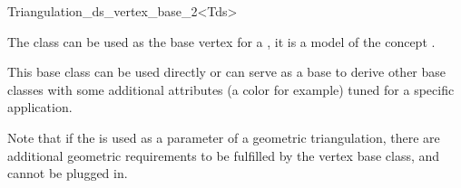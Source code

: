 

\begin{ccRefClass}{Triangulation_ds_vertex_base_2<Tds>}  %


\ccDefinition

The class  can be used as the base vertex
for a , it is a model of the concept
.

This base class can be used directly or can serve as a base to derive
other base classes with some additional attributes (a color for
example) tuned for a specific application.

Note that if the  
is used as a parameter of a
geometric triangulation, there are additional geometric requirements
to be fulfilled by the vertex base class,
and  cannot be plugged in.



\ccIsModel


\ccSeeAlso

\\
  

\end{ccRefClass}


